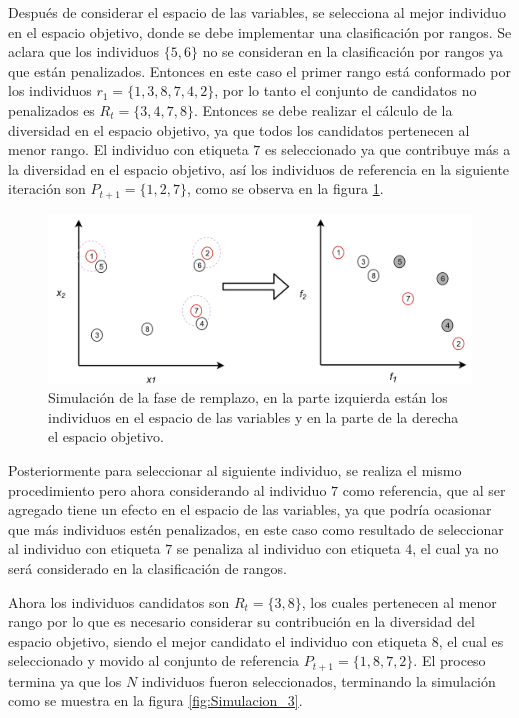 Después de considerar el espacio de las variables, se selecciona al mejor individuo en el espacio objetivo, donde se debe implementar una clasificación por rangos.
%
Se aclara que los individuos $\{5, 6\}$ no se consideran en la clasificación por rangos ya que están penalizados.
%
Entonces en este caso el primer rango está conformado por los individuos $r_1 = \{1, 3, 8, 7, 4, 2 \}$, por lo tanto el conjunto de candidatos no penalizados es $R_t = \{3,4,7,8\}$.
%
Entonces se debe realizar el cálculo de la diversidad en el espacio objetivo, ya que todos los candidatos pertenecen al menor rango.
%
El individuo con etiqueta $7$ es seleccionado ya que contribuye más a la diversidad en el espacio objetivo, así los individuos de referencia en la siguiente iteración son $P_{t+1} = \{1, 2, 7\}$, como se observa en la figura \ref{fig:Simulacion_2}.
%
\begin{figure}[H]
\centering
\scriptsize
\includegraphics[scale=0.2]
{Figures_Chapter3/Fase_Remplazo_2.png}
\decoRule
\caption{Simulación de la fase de remplazo, en la parte izquierda están los individuos en el espacio de las variables y en la parte de la derecha el espacio objetivo.}
\label{fig:Simulacion_2}
\end{figure}

Posteriormente para seleccionar al siguiente individuo, se realiza el mismo procedimiento pero ahora considerando al individuo $7$ como referencia, que al ser agregado tiene un efecto en el espacio de las variables, ya que podría ocasionar que más individuos estén penalizados, en este caso como resultado de seleccionar al individuo con etiqueta $7$ se penaliza al individuo con etiqueta $4$, el cual ya no será considerado en la clasificación de rangos.
%

Ahora los individuos candidatos son $R_t = \{3, 8\}$, los cuales pertenecen al menor rango por lo que es necesario considerar su contribución en la diversidad del espacio objetivo, siendo el mejor candidato el individuo con etiqueta $8$, el cual es seleccionado y movido al conjunto de referencia $P_{t+1} = \{1, 8 ,7, 2\}$.
%
El proceso termina ya que los $N$ individuos fueron seleccionados, terminando la simulación como se muestra en la figura \ref{fig:Simulacion_3}.

